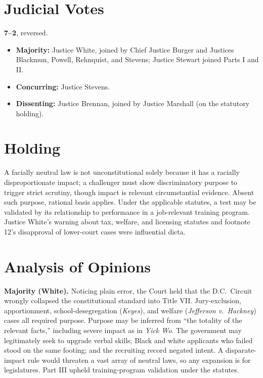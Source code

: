 \documentclass[12pt]{article}
\begin{document}
\section{Judicial Votes}

\textbf{7--2}, reversed.
\begin{itemize}
\item \textbf{Majority:} Justice White, joined by Chief Justice Burger and Justices Blackmun, Powell, Rehnquist, and Stevens; Justice Stewart joined Parts I and II.
\item \textbf{Concurring:} Justice Stevens.
\item \textbf{Dissenting:} Justice Brennan, joined by Justice Marshall (on the statutory holding).
\end{itemize}

\section{Holding}

A facially neutral law is not unconstitutional solely because it has a racially disproportionate impact; a challenger must show discriminatory purpose to trigger strict scrutiny, though impact is relevant circumstantial evidence. Absent such purpose, rational basis applies. Under the applicable statutes, a test may be validated by its relationship to performance in a job-relevant training program. Justice White's warning about tax, welfare, and licensing statutes and footnote 12's disapproval of lower-court cases were influential dicta.

\section{Analysis of Opinions}

\textbf{Majority (White).} Noticing plain error, the Court held that the D.C.\ Circuit wrongly collapsed the constitutional standard into Title VII. Jury-exclusion, apportionment, school-desegregation (\textit{Keyes}), and welfare (\textit{Jefferson v.\ Hackney}) cases all required purpose. Purpose may be inferred from ``the totality of the relevant facts,'' including severe impact as in \textit{Yick Wo}. The government may legitimately seek to upgrade verbal skills; Black and white applicants who failed stood on the same footing; and the recruiting record negated intent. A disparate-impact rule would threaten a vast array of neutral laws, so any expansion is for legislatures. Part III upheld training-program validation under the statutes.
\end{document}

